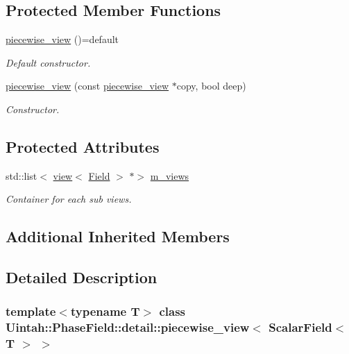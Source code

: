 \subsection*{Protected Member Functions}
\begin{DoxyCompactItemize}
\item 
\hyperlink{classUintah_1_1PhaseField_1_1detail_1_1piecewise__view_3_01ScalarField_3_01T_01_4_01_4_a08150ac6e4892b7f07a5465ef5f4d0b6}{piecewise\+\_\+view} ()=default
\begin{DoxyCompactList}\small\item\em Default constructor. \end{DoxyCompactList}\item 
\hyperlink{classUintah_1_1PhaseField_1_1detail_1_1piecewise__view_3_01ScalarField_3_01T_01_4_01_4_a1e74897647aa4d6d076924a5e8d78e6b}{piecewise\+\_\+view} (const \hyperlink{classUintah_1_1PhaseField_1_1detail_1_1piecewise__view}{piecewise\+\_\+view} $\ast$copy, bool deep)
\begin{DoxyCompactList}\small\item\em Constructor. \end{DoxyCompactList}\end{DoxyCompactItemize}
\subsection*{Protected Attributes}
\begin{DoxyCompactItemize}
\item 
std\+::list$<$ \hyperlink{classUintah_1_1PhaseField_1_1detail_1_1view}{view}$<$ \hyperlink{structUintah_1_1PhaseField_1_1ScalarField}{Field} $>$ $\ast$$>$ \hyperlink{classUintah_1_1PhaseField_1_1detail_1_1piecewise__view_3_01ScalarField_3_01T_01_4_01_4_ae5ef4268fdc925bd57ea7abf8d1dc4a7}{m\+\_\+views}
\begin{DoxyCompactList}\small\item\em Container for each sub views. \end{DoxyCompactList}\end{DoxyCompactItemize}
\subsection*{Additional Inherited Members}


\subsection{Detailed Description}
\subsubsection*{template$<$typename T$>$\newline
class Uintah\+::\+Phase\+Field\+::detail\+::piecewise\+\_\+view$<$ Scalar\+Field$<$ T $>$ $>$}

